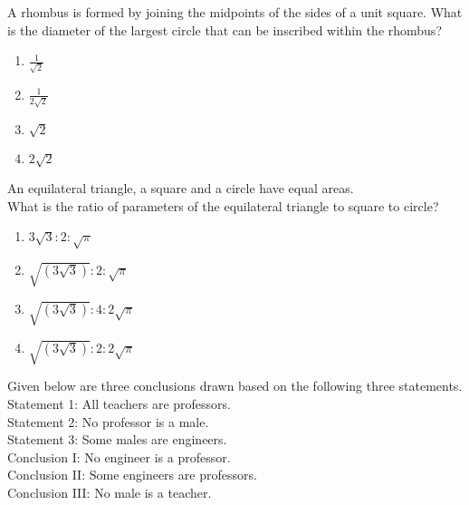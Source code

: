     \item A rhombus is formed by joining the midpoints of the sides of a unit square. What is the diameter of the largest circle that can be inscribed within the rhombus?
    \begin{enumerate}
        \item $\frac{1}{\sqrt{2}}$
        \item $\frac{1}{2\sqrt{2}}$
        \item $\sqrt{2}$
        \item $2\sqrt{2}$
    \end{enumerate}
    \item An equilateral triangle, a square and a circle have equal areas.\\What is the ratio of parameters of the equilateral triangle to square to circle?
    \begin{enumerate}
        \item $3\sqrt{3} : 2 : \sqrt{\pi}$
        \item $\sqrt{(3\sqrt{3})} : 2 : \sqrt{\pi}$
        \item $\sqrt{(3\sqrt{3})} : 4 : 2\sqrt{\pi}$
        \item $\sqrt{(3\sqrt{3})} : 2 : 2\sqrt{\pi}$
    \end{enumerate}
    \item Given below are three conclusions drawn based on the following three statements.\\
Statement 1: All teachers are professors.\\
Statement 2: No professor is a male.\\
Statement 3: Some males are engineers.\\

Conclusion I: No engineer is a professor.\\
Conclusion II: Some engineers are professors.\\
Conclusion III: No male is a teacher.\\

